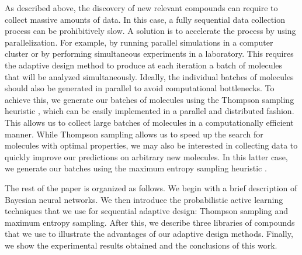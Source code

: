 As described above, the discovery of new relevant compounds can require to collect massive amounts of data. In this case,
a fully sequential data collection process can be prohibitively slow. A solution is to accelerate the process by using parallelization. For example, by running parallel simulations in a computer cluster or by performing simultaneous experiments in a laboratory.
This requires the adaptive design method to produce at each iteration a batch of molecules that will be
analyzed simultaneously. Ideally, the individual batches of molecules should also be generated in parallel to avoid computational bottlenecks. To achieve this, we generate our batches of molecules using the Thompson sampling heuristic \cite{Thompson_1933},
which can be easily implemented in a parallel and distributed fashion. This allows us to collect large
batches of molecules in a computationally efficient manner. While Thompson sampling allows us to speed up
the search for molecules with optimal properties, we may also be interested in collecting data to quickly
improve our predictions on arbitrary new molecules. In this latter case, we generate our batches
using the maximum entropy sampling heuristic \cite{MacKay_1992}.

The rest of the paper is organized as follows. We begin with a brief description of Bayesian neural networks. We then introduce the probabilistic active learning techniques that we use for sequential adaptive design: Thompson sampling and maximum entropy sampling. After this, we describe three libraries of compounds that we use to illustrate the advantages of our adaptive design methods. Finally, we show the experimental results obtained and the conclusions of this work.
